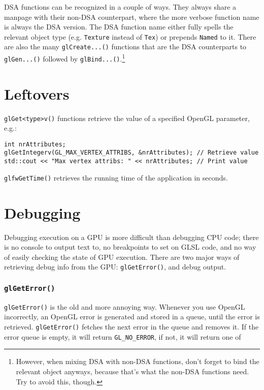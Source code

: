 \documentclass[8pt, table, xcdraw]{article}%
\begin{document}
DSA functions can be recognized in a couple of ways. They always share a manpage with their non-DSA counterpart, where the more verbose function name is always the DSA version. The DSA function name either fully spells the relevant object type (e.g. \lstinline{Texture} instead of \lstinline{Tex}) or prepends \lstinline{Named} to it. There are also the many \lstinline{glCreate...()} functions that are the DSA counterparts to \lstinline{glGen...()} followed by \lstinline{glBind...()}.\footnote{However, when mixing DSA with non-DSA functions, don't forget to bind the relevant object anyways, because that's what the non-DSA functions need. Try to avoid this, though.}

\section{Leftovers} \label{leftovers}

\lstinline{glGet<type>v()} functions retrieve the value of a specified OpenGL parameter, e.g.:

\begin{lstlisting}
int nrAttributes;
glGetIntegerv(GL_MAX_VERTEX_ATTRIBS, &nrAttributes); // Retrieve value
std::cout << "Max vertex attribs: " << nrAttributes; // Print value
\end{lstlisting}

\lstinline{glfwGetTime()} retrieves the running time of the application in seconds.

\section{Debugging}

Debugging execution on a GPU is more difficult than debugging CPU code; there is no console to output text to, no breakpoints to set on GLSL code, and no way of easily checking the state of GPU execution. There are two major ways of retrieving debug info from the GPU: \lstinline|glGetError()|, and debug output.

\subsubsection{\lstinline|glGetError()|}

\lstinline|glGetError()| is the old and more annoying way. Whenever you use OpenGL incorrectly, an OpenGL error is generated and stored in a queue, until the error is retrieved. \lstinline|glGetError()| fetches the next error in the queue and removes it. If the error queue is empty, it will return \lstinline{GL_NO_ERROR}, if not, it will return one of
\end{document}
